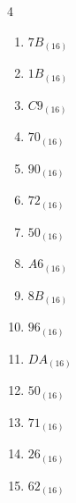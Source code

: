 \begin{multicols}{4}
\begin{enumerate}
        \phantom{$=141$}

  \item $7B_{(16)}$

        \phantom{$=123$}

  \item $1B_{(16)}$

        \phantom{$=27$}

  \item $C9_{(16)}$

        \phantom{$=201$}

  \item $70_{(16)}$

        \phantom{$=112$}

  \item $90_{(16)}$

        \phantom{$=144$}

  \item $72_{(16)}$

        \phantom{$=114$}

  \item $50_{(16)}$

        \phantom{$=80$}

  \item $A6_{(16)}$

        \phantom{$=166$}

  \item $8B_{(16)}$

        \phantom{$=139$}

  \item $96_{(16)}$

        \phantom{$=150$}

\columnbreak %

\resetques

  \item $DA_{(16)}$

        \phantom{$=218$}

  \item $50_{(16)}$

        \phantom{$=80$}

  \item $71_{(16)}$

        \phantom{$=113$}

  \item $26_{(16)}$

        \phantom{$=38$}

  \item $62_{(16)}$


\end{enumerate}
\end{multicols}
